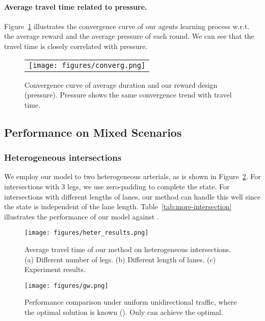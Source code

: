 \paragraph{Average travel time related to pressure.}
Figure~\ref{fig:convergence} illustrates the convergence curve of our agents learning process w.r.t. the average reward and the average pressure of each round. We can see that the travel time is closely correlated with pressure.

\begin{figure}[t]
  \begin{tabular}{c}
   \texttt{[image: figures/converg.png]} \\
   \end{tabular}
     \caption{Convergence curve of average duration and our reward design (pressure). Pressure shows the same convergence trend with travel time.}
    \label{fig:convergence}
\end{figure}

\subsection{Performance on Mixed Scenarios}

\subsubsection{Heterogeneous intersections}
We employ our model to two heterogeneous arterials, as is shown in Figure~\ref{fig:heter_inter}. For intersections with 3 legs, we use zero-padding to complete the state. For intersections with different lengths of lanes, our method can handle this well since the state is independent of the lane length. Table~\ref{tab:more-intersection} illustrates the performance of our model against \Maxpressure. 


\begin{figure}[t!]
   \texttt{[image: figures/heter\_results.png]} 
     \caption{Average travel time of our method on heterogeneous intersections. (a) Different number of legs. (b)  Different length of lanes. (c) Experiment results.}
    \label{fig:heter_inter}
    \vspace{-2mm}
\end{figure}
\vspace{-2mm}

\begin{figure}[t!]
   \texttt{[image: figures/gw.png]} 
     \caption{Performance comparison under uniform unidirectional traffic, where the optimal solution is known (\Greenwave). Only \PressLight can achieve the optimal.}
    \label{fig:optimal}
    \vspace{-3mm}
\end{figure}


